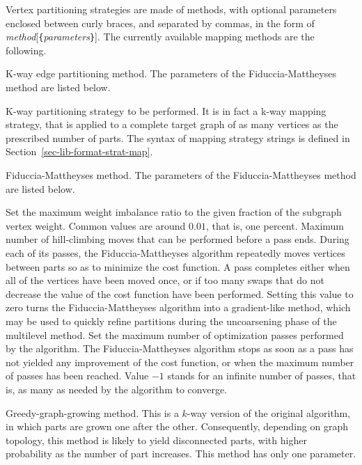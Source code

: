 Vertex partitioning strategies are made of methods, with optional
parameters enclosed between curly braces, and separated by commas, in
the form of {\it method\/}{[{\tt \{}{\it parameters\/}{\tt \}}]}\enspace.
The currently available mapping methods are the following.

\begin{itemize}
\iteme[{\tt e}]
K-way edge partitioning method. The parameters of the Fiduccia-Mattheyses method
are listed below.
\begin{itemize}
\iteme[{\tt strat=}{\it strat}]
K-way partitioning strategy to be performed. It is in fact a k-way
mapping strategy, that is applied to a complete target graph of as
many vertices as the prescribed number of parts. The syntax of mapping
strategy strings is defined in Section~\ref{sec-lib-format-strat-map}.
\end{itemize}
\iteme[{\tt f}]
Fiduccia-Mattheyses method. The parameters of the Fiduccia-Mattheyses method
are listed below.
\begin{itemize}
\iteme[{\tt bal=}{\it rat}]
Set the maximum weight imbalance ratio to the given fraction of
the subgraph vertex weight. Common values are around $0.01$, that
is, one percent.
\iteme[{\tt move=}{\it nbr}]
Maximum number of hill-climbing moves that can be performed before a
pass ends. During each of its passes, the Fiduccia-Mattheyses
algorithm repeatedly moves vertices between parts so as to
minimize the cost function. A pass completes either when all of the
vertices have been moved once, or if too many swaps that do not
decrease the value of the cost function have been performed. Setting
this value to zero turns the Fiduccia-Mattheyses algorithm into a
gradient-like method, which may be used to quickly refine partitions
during the uncoarsening phase of the multilevel method.
\iteme[{\tt pass=}{\it nbr}]
Set the maximum number of optimization passes performed by the
algorithm. The Fiduccia-Mattheyses algorithm stops as soon as a pass
has not yielded any improvement of the cost function, or when the
maximum number of passes has been reached. Value $-1$ stands for an
infinite number of passes, that is, as many as needed by the algorithm
to converge.
\end{itemize}
\iteme[{\tt h}]
Greedy-graph-growing method. This is a $k$-way version of the
original algorithm, in which parts are grown one after the
other. Consequently, depending on graph topology, this method is
likely to yield disconnected parts, with higher probability as the
number of part increases. This method has only one parameter.

\end{itemize}
